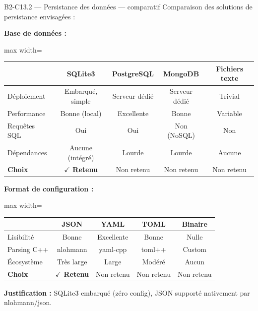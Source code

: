 \documentclass[aspectratio=169,10pt]{beamer}
\begin{document}
\begin{frame}{B2-C13.2 — Persistance des données — comparatif}
\footnotesize
Comparaison des solutions de persistance envisagées :

\vspace{0.2em}
\textbf{Base de données :}
\begin{adjustbox}{max width=\textwidth}
\begin{tabular}{l c c c c}
\toprule
 & \textbf{SQLite3} & \textbf{PostgreSQL} & \textbf{MongoDB} & \textbf{Fichiers texte} \\
\midrule
Déploiement     & Embarqué, simple  & Serveur dédié   & Serveur dédié  & Trivial \\
Performance     & Bonne (local)     & Excellente      & Bonne          & Variable \\
Requêtes SQL    & Oui               & Oui             & Non (NoSQL)    & Non \\
Dépendances     & Aucune (intégré)  & Lourde          & Lourde         & Aucune \\
\textbf{Choix}  & \textbf{$\checkmark$ Retenu} & Non retenu & Non retenu & Non retenu \\
\bottomrule
\end{tabular}
\end{adjustbox}

\vspace{0.2em}
\textbf{Format de configuration :}
\begin{adjustbox}{max width=\textwidth}
\begin{tabular}{l c c c c}
\toprule
 & \textbf{JSON} & \textbf{YAML} & \textbf{TOML} & \textbf{Binaire} \\
\midrule
Lisibilité    & Bonne     & Excellente & Bonne    & Nulle \\
Parsing C++   & nlohmann  & yaml-cpp   & toml++   & Custom \\
Écosystème    & Très large & Large     & Modéré   & Aucun \\
\textbf{Choix} & \textbf{$\checkmark$ Retenu} & Non retenu & Non retenu & Non retenu \\
\bottomrule
\end{tabular}
\end{adjustbox}

\vspace{0.2em}
\textbf{Justification :} SQLite3 embarqué (zéro config), JSON supporté nativement par nlohmann/json.
\end{frame}
\end{document}
